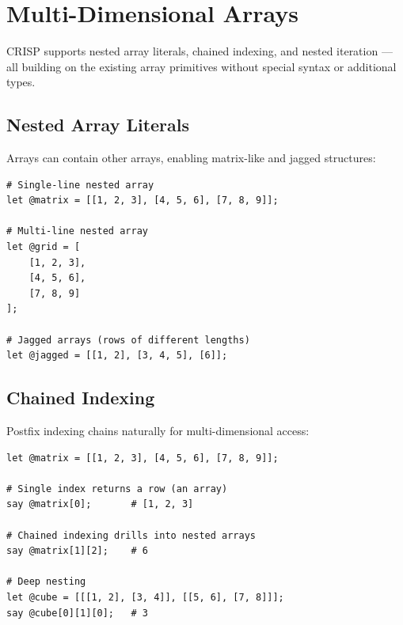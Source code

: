 \section{Multi-Dimensional Arrays}

CRISP supports nested array literals, chained indexing, and nested iteration — all building on the existing array primitives without special syntax or additional types.

\subsection{Nested Array Literals}

Arrays can contain other arrays, enabling matrix-like and jagged structures:

\begin{tcolorbox}[colback=codebg, colframe=darkpurple, colbacktitle=darkpurple, title=\textbf{\textcolor{codegold}{Nested Arrays}}, fonttitle=\bfseries, sharp corners]
\begin{lstlisting}
# Single-line nested array
let @matrix = [[1, 2, 3], [4, 5, 6], [7, 8, 9]];

# Multi-line nested array
let @grid = [
    [1, 2, 3],
    [4, 5, 6],
    [7, 8, 9]
];

# Jagged arrays (rows of different lengths)
let @jagged = [[1, 2], [3, 4, 5], [6]];
\end{lstlisting}
\end{tcolorbox}

\subsection{Chained Indexing}

Postfix indexing chains naturally for multi-dimensional access:

\begin{tcolorbox}[colback=codebg, colframe=darkpurple, colbacktitle=darkpurple, title=\textbf{\textcolor{codegold}{Chained Indexing}}, fonttitle=\bfseries, sharp corners]
\begin{lstlisting}
let @matrix = [[1, 2, 3], [4, 5, 6], [7, 8, 9]];

# Single index returns a row (an array)
say @matrix[0];       # [1, 2, 3]

# Chained indexing drills into nested arrays
say @matrix[1][2];    # 6

# Deep nesting
let @cube = [[[1, 2], [3, 4]], [[5, 6], [7, 8]]];
say @cube[0][1][0];   # 3
\end{lstlisting}
\end{tcolorbox}

